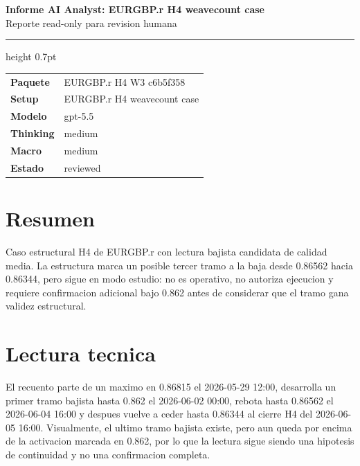 \documentclass[11pt,a4paper]{article}
\begin{document}
\begin{center}
{\huge\bfseries Informe AI Analyst: EURGBP.r H4 weavecount case}\\[0.25em]
{\large Reporte read-only para revision humana}
\end{center}

\vspace{0.2em}
\hrule height 0.7pt
\vspace{0.9em}

\begin{tabularx}{\textwidth}{>{\bfseries}p{3.2cm}X}
Paquete & EURGBP.r H4 W3 c6b5f358 \\
Setup & EURGBP.r H4 weavecount case \\
Modelo & gpt-5.5 \\
Thinking & medium \\
Macro & medium \\
Estado & reviewed \\
\end{tabularx}

\vspace{0.75em}

\vspace{0.4em}

\section*{Resumen}
Caso estructural H4 de EURGBP.r con lectura bajista candidata de calidad media. La estructura marca un posible tercer tramo a la baja desde 0.86562 hacia 0.86344, pero sigue en modo estudio: no es operativo, no autoriza ejecucion y requiere confirmacion adicional bajo 0.862 antes de considerar que el tramo gana validez estructural.

\section*{Lectura tecnica}
El recuento parte de un maximo en 0.86815 el 2026-05-29 12:00, desarrolla un primer tramo bajista hasta 0.862 el 2026-06-02 00:00, rebota hasta 0.86562 el 2026-06-04 16:00 y despues vuelve a ceder hasta 0.86344 al cierre H4 del 2026-06-05 16:00. Visualmente, el ultimo tramo bajista existe, pero aun queda por encima de la activacion marcada en 0.862, por lo que la lectura sigue siendo una hipotesis de continuidad y no una confirmacion completa.
\end{document}
